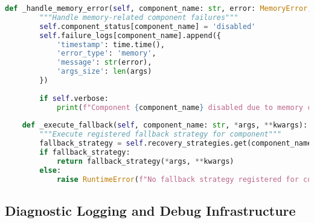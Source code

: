 \begin{lstlisting}[language=Python, caption=Component Isolation and Recovery Framework]
    def _handle_memory_error(self, component_name: str, error: MemoryError, *args, **kwargs):
        """Handle memory-related component failures"""
        self.component_status[component_name] = 'disabled'
        self.failure_logs[component_name].append({
            'timestamp': time.time(),
            'error_type': 'memory',
            'message': str(error),
            'args_size': len(args)
        })
        
        if self.verbose:
            print(f"Component {component_name} disabled due to memory constraints")
    
    def _execute_fallback(self, component_name: str, *args, **kwargs):
        """Execute registered fallback strategy for component"""
        fallback_strategy = self.recovery_strategies.get(component_name)
        if fallback_strategy:
            return fallback_strategy(*args, **kwargs)
        else:
            raise RuntimeError(f"No fallback strategy registered for component {component_name}")
\end{lstlisting}

\subsection{Diagnostic Logging and Debug Infrastructure}
\label{appendix:diagnostic-logging}

